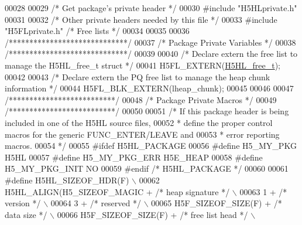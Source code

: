 \begin{DoxyCode}
00028 
00029 \textcolor{comment}{/* Get package's private header */}
00030 \textcolor{preprocessor}{#include "H5HLprivate.h"}
00031 
00032 \textcolor{comment}{/* Other private headers needed by this file */}
00033 \textcolor{preprocessor}{#include "H5FLprivate.h"}    \textcolor{comment}{/* Free lists                           */}
00034 
00035 
00036 \textcolor{comment}{/*****************************/}
00037 \textcolor{comment}{/* Package Private Variables */}
00038 \textcolor{comment}{/*****************************/}
00039 
00040 \textcolor{comment}{/* Declare extern the free list to manage the H5HL\_free\_t struct */}
00041 H5FL\_EXTERN(\hyperlink{struct_h5_h_l__free__t}{H5HL\_free\_t});
00042 
00043 \textcolor{comment}{/* Declare extern the PQ free list to manage the heap chunk information */}
00044 H5FL\_BLK\_EXTERN(lheap\_chunk);
00045 
00046 
00047 \textcolor{comment}{/**************************/}
00048 \textcolor{comment}{/* Package Private Macros */}
00049 \textcolor{comment}{/**************************/}
00050 
00051 \textcolor{comment}{/* If this package header is being included in one of the H5HL source files,}
00052 \textcolor{comment}{ *      define the proper control macros for the generic FUNC\_ENTER/LEAVE and}
00053 \textcolor{comment}{ *      error reporting macros.}
00054 \textcolor{comment}{ */}
00055 \textcolor{preprocessor}{#ifdef H5HL\_PACKAGE}
00056 \textcolor{preprocessor}{#define H5\_MY\_PKG       H5HL}
00057 \textcolor{preprocessor}{#define H5\_MY\_PKG\_ERR   H5E\_HEAP}
00058 \textcolor{preprocessor}{#define H5\_MY\_PKG\_INIT  NO}
00059 \textcolor{preprocessor}{#endif }\textcolor{comment}{/* H5HL\_PACKAGE */}\textcolor{preprocessor}{}
00060 
00061 \textcolor{preprocessor}{#define H5HL\_SIZEOF\_HDR(F)                                                  \(\backslash\)}
00062 \textcolor{preprocessor}{    H5HL\_ALIGN(H5\_SIZEOF\_MAGIC +    }\textcolor{comment}{/* heap signature   */}\textcolor{preprocessor}{                  \(\backslash\)}
00063 \textcolor{preprocessor}{        1 +                         }\textcolor{comment}{/* version          */}\textcolor{preprocessor}{                  \(\backslash\)}
00064 \textcolor{preprocessor}{        3 +                         }\textcolor{comment}{/* reserved         */}\textcolor{preprocessor}{                  \(\backslash\)}
00065 \textcolor{preprocessor}{        H5F\_SIZEOF\_SIZE(F) +        }\textcolor{comment}{/* data size        */}\textcolor{preprocessor}{                  \(\backslash\)}
00066 \textcolor{preprocessor}{        H5F\_SIZEOF\_SIZE(F) +        }\textcolor{comment}{/* free list head   */}\textcolor{preprocessor}{                  \(\backslash\)}

\end{DoxyCode}
